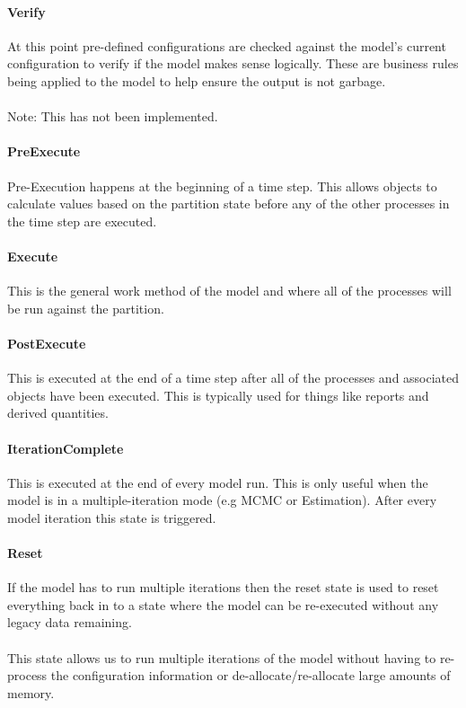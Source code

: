 \paragraph*{Verify}
At this point pre-defined configurations are checked against the model's current configuration to verify if the model makes sense logically. These are business rules being applied to the model to help ensure the output is not garbage.
\\\\
Note: This has not been implemented.
\paragraph*{PreExecute}
Pre-Execution happens at the beginning of a time step. This allows objects to calculate values based on the partition state before any of the other processes in the time step are executed.
\paragraph*{Execute}
This is the general work method of the model and where all of the processes will be run against the partition.
\paragraph*{PostExecute}
This is executed at the end of a time step after all of the processes and associated objects have been executed. This is typically used for things like reports and derived quantities.

\paragraph*{IterationComplete}
This is executed at the end of every model run. This is only useful when the model is in a multiple-iteration mode (e.g MCMC or Estimation). After every model iteration this state is triggered.

\paragraph*{Reset}
If the model has to run multiple iterations then the reset state is used to reset everything back in to a state where the model can be re-executed without any legacy data remaining.
\\\\
This state allows us to run multiple iterations of the model without having to re-process the configuration information or de-allocate/re-allocate large amounts of memory.


